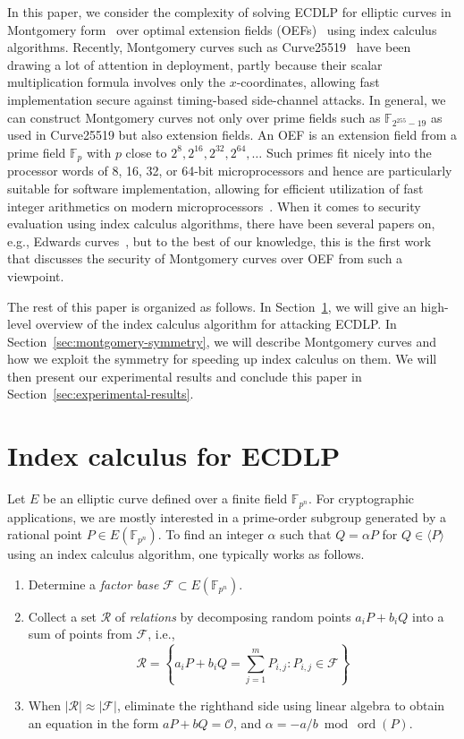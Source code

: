 \documentclass{llncs}
\DeclareMathOperator{\ord}{ord}
\newcommand{\F}[1]{\ensuremath{\mathbb F_{#1}}}
\begin{document}
In this paper, we consider the complexity of solving ECDLP for
elliptic curves in Montgomery form~\cite{1987-montgomery} over optimal
extension fields (OEFs)~\cite{DBLP:conf/crypto/BaileyP98} using index
calculus algorithms.
%
Recently, Montgomery curves such as
Curve25519~\cite{DBLP:conf/pkc/Bernstein06} have been drawing a lot of
attention in deployment, partly because their scalar multiplication
formula involves only the $x$-coordinates, allowing fast
implementation secure against timing-based side-channel attacks.
%
In general, we can construct Montgomery curves not only over prime
fields such as \F{2^{255}-19} as used in Curve25519 but also extension
fields.
%
An OEF is an extension field from a prime field \F p with $p$ close to
$2^8, 2^{16}, 2^{32}, 2^{64}, \ldots$
%
Such primes fit nicely into the processor words of 8, 16, 32, or
64-bit microprocessors and hence are particularly suitable for
software implementation, allowing for efficient utilization of fast
integer arithmetics on modern
microprocessors~\cite{DBLP:conf/crypto/BaileyP98}.
%
When it comes to security evaluation using index calculus algorithms,
there have been several papers on, e.g., Edwards
curves~\cite{DBLP:journals/joc/FaugereGHR14,DBLP:conf/indocrypt/GalbraithG14},
but to the best of our knowledge, this is the first work that
discusses the security of Montgomery curves over OEF from such a
viewpoint.

The rest of this paper is organized as follows.
%
In Section~\ref{sec:index-calculus-ecdlp}, we will give an high-level
overview of the index calculus algorithm for attacking ECDLP.
%
In Section~\ref{sec:montgomery-symmetry}, we will describe Montgomery
curves and how we exploit the symmetry for speeding up index calculus
on them.
%
We will then present our experimental results and conclude this paper
in Section~\ref{sec:experimental-results}.

\section{Index calculus for ECDLP}
%
\label{sec:index-calculus-ecdlp}
%
Let $E$ be an elliptic curve defined over a finite field \F{p^n}.
%
For cryptographic applications, we are mostly interested in a
prime-order subgroup generated by a rational point $P\in E(\F{p^n})$.
%
To find an integer $\alpha$ such that $Q=\alpha P$ for
$Q\in\langle P\rangle$ using an index calculus algorithm, one
typically works as follows.
%
\begin{enumerate}
%
\item Determine a \emph{factor base} $\mathcal F\subset E(\F{p^n})$.
%
\item Collect a set $\mathcal R$ of \emph{relations} by decomposing
  random points $a_iP+b_iQ$ into a sum of points from $\mathcal F$,
  i.e.,
  \[ \mathcal
    R=\left\{a_iP+b_iQ=\sum_{j=1}^mP_{i,j}:P_{i,j}\in\mathcal
      F\right\} \]
%
\item When $|\mathcal R|\approx|\mathcal F|$, eliminate the righthand
  side using linear algebra to obtain an equation in the form
  $aP+bQ=\mathcal O$, and $\alpha=-a/b\bmod\ord(P)$.
%
\end{enumerate} 
\end{document}
